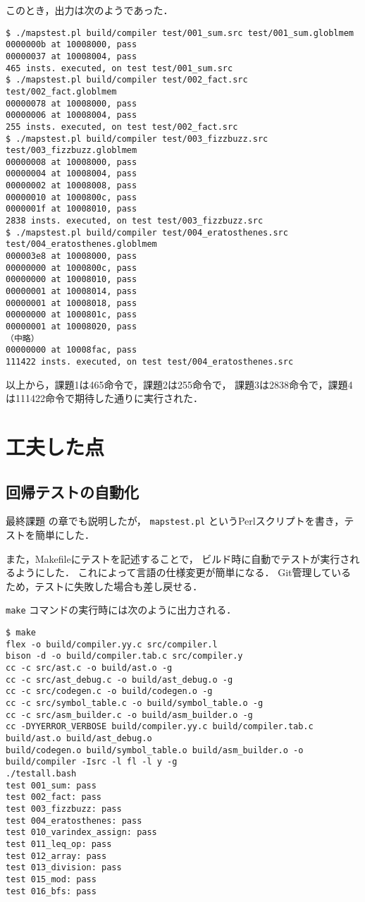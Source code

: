 \documentclass[lualatex, a4paper, ja=standard]{bxjsarticle}
\begin{document}
このとき，出力は次のようであった．
\begin{Verbatim}[frame=lines]
$ ./mapstest.pl build/compiler test/001_sum.src test/001_sum.globlmem
0000000b at 10008000, pass
00000037 at 10008004, pass
465 insts. executed, on test test/001_sum.src
$ ./mapstest.pl build/compiler test/002_fact.src test/002_fact.globlmem
00000078 at 10008000, pass
00000006 at 10008004, pass
255 insts. executed, on test test/002_fact.src
$ ./mapstest.pl build/compiler test/003_fizzbuzz.src test/003_fizzbuzz.globlmem
00000008 at 10008000, pass
00000004 at 10008004, pass
00000002 at 10008008, pass
00000010 at 1000800c, pass
0000001f at 10008010, pass
2838 insts. executed, on test test/003_fizzbuzz.src
$ ./mapstest.pl build/compiler test/004_eratosthenes.src test/004_eratosthenes.globlmem
000003e8 at 10008000, pass
00000000 at 1000800c, pass
00000000 at 10008010, pass
00000001 at 10008014, pass
00000001 at 10008018, pass
00000000 at 1000801c, pass
00000001 at 10008020, pass
（中略）
00000000 at 10008fac, pass
111422 insts. executed, on test test/004_eratosthenes.src
\end{Verbatim}

以上から，課題1は465命令で，課題2は255命令で，
課題3は2838命令で，課題4は111422命令で期待した通りに実行された．

\section{工夫した点}

\subsection{回帰テストの自動化}

最終課題 の章でも説明したが，
\verb|mapstest.pl| というPerlスクリプトを書き，テストを簡単にした．

また，Makefileにテストを記述することで，
ビルド時に自動でテストが実行されるようにした．
これによって言語の仕様変更が簡単になる．
Git管理しているため，テストに失敗した場合も差し戻せる．

\verb|make| コマンドの実行時には次のように出力される．

\begin{Verbatim}
$ make
flex -o build/compiler.yy.c src/compiler.l
bison -d -o build/compiler.tab.c src/compiler.y
cc -c src/ast.c -o build/ast.o -g
cc -c src/ast_debug.c -o build/ast_debug.o -g
cc -c src/codegen.c -o build/codegen.o -g
cc -c src/symbol_table.c -o build/symbol_table.o -g
cc -c src/asm_builder.c -o build/asm_builder.o -g
cc -DYYERROR_VERBOSE build/compiler.yy.c build/compiler.tab.c build/ast.o build/ast_debug.o 
build/codegen.o build/symbol_table.o build/asm_builder.o -o build/compiler -Isrc -l fl -l y -g
./testall.bash
test 001_sum: pass
test 002_fact: pass
test 003_fizzbuzz: pass
test 004_eratosthenes: pass
test 010_varindex_assign: pass
test 011_leq_op: pass
test 012_array: pass
test 013_division: pass
test 015_mod: pass
test 016_bfs: pass
\end{Verbatim}
\end{document}
